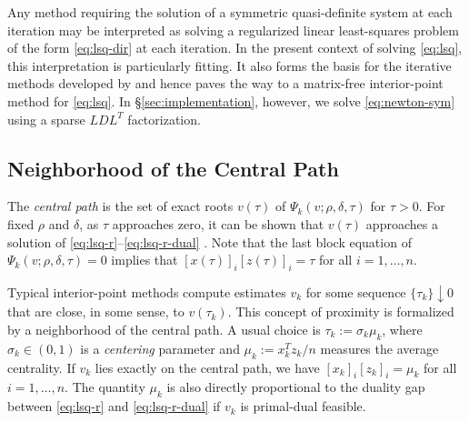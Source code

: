 \documentclass{amsart}
\begin{document}
Any method requiring the solution of a symmetric quasi-definite system at each
iteration may be interpreted as solving a regularized linear least-squares
problem of the form \eqref{eq:lsq-dir} at each iteration. In the present
context of solving \eqref{eq:lsq}, this interpretation is particularly fitting.
It also forms the basis for the iterative methods developed by
\cite{arioli-orban-2012} and hence paves the way to a matrix-free
interior-point method for \eqref{eq:lsq}. In \S\ref{sec:implementation}, 
however, we solve \eqref{eq:newton-sym} using a sparse $LDL^T$ factorization.

\subsection{Neighborhood of the Central Path}

The \textit{central path} is the set of exact roots $v(\tau)$ of
$\Psi_k(v;\rho,\delta,\tau)$ for $\tau > 0$. For fixed $\rho$ and $\delta$, as
$\tau$ approaches zero, it can be shown that $v(\tau)$ approaches a solution of
\eqref{eq:lsq-r}--\eqref{eq:lsq-r-dual} \citep{FiaccoMcCormick}.
Note that the last block equation of $\Psi_k(v;\rho,\delta,\tau) = 0$ implies
that $[x(\tau)]_i [z(\tau)]_i = \tau$ for all $i = 1, \ldots, n$.

Typical interior-point methods compute estimates $v_k$ for some sequence
$\{\tau_k\} \downarrow 0$ that are close, in some sense, to $v(\tau_k)$. This
concept of proximity is formalized by a neighborhood of the central path. A
usual choice is $\tau_k := \sigma_k \mu_k$, where $\sigma_k \in (0,1)$ is a
\textit{centering} parameter and $\mu_k := x_k^T z_k / n$ measures the
average centrality. If $v_k$ lies exactly on the central path, we have $[x_k]_i
[z_k]_i = \mu_k$ for all $i = 1, \ldots, n$. The quantity $\mu_k$ is also
directly proportional to the duality gap between \eqref{eq:lsq-r} and
\eqref{eq:lsq-r-dual} if $v_k$ is primal-dual feasible.
\end{document}
